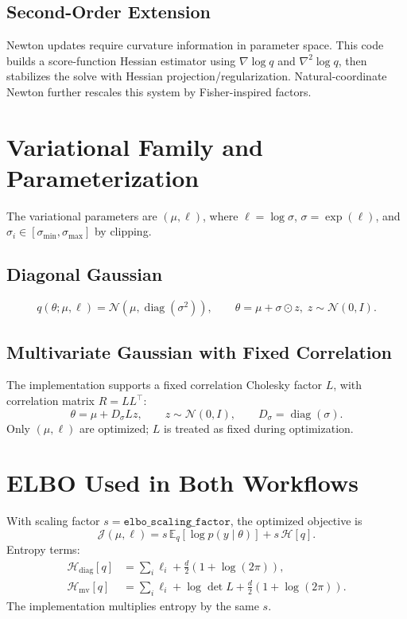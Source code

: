 \documentclass[11pt]{article}
\begin{document}
\subsection{Second-Order Extension}
Newton updates require curvature information in parameter space.
This code builds a score-function Hessian estimator using \(\nabla \log q\) and
\(\nabla^2 \log q\), then stabilizes the solve with Hessian projection/regularization.
Natural-coordinate Newton further rescales this system by Fisher-inspired factors.

\section{Variational Family and Parameterization}
The variational parameters are \((\mu,\ell)\), where \(\ell=\log \sigma\), \(\sigma=\exp(\ell)\), and \(\sigma_i\in[\sigma_{\min},\sigma_{\max}]\) by clipping.

\subsection{Diagonal Gaussian}
\begin{equation}
q(\theta;\mu,\ell)=\mathcal{N}\!\left(\mu,\operatorname{diag}(\sigma^2)\right),\qquad
\theta=\mu+\sigma\odot z,\; z\sim\mathcal{N}(0,I).
\end{equation}

\subsection{Multivariate Gaussian with Fixed Correlation}
The implementation supports a fixed correlation Cholesky factor \(L\), with
correlation matrix \(R=LL^\top\):
\begin{equation}
\theta=\mu + D_\sigma L z,\qquad z\sim\mathcal{N}(0,I),\qquad
D_\sigma=\operatorname{diag}(\sigma).
\end{equation}
Only \((\mu,\ell)\) are optimized; \(L\) is treated as fixed during optimization.

\section{ELBO Used in Both Workflows}
With scaling factor \(s=\texttt{elbo\_scaling\_factor}\), the optimized objective is
\begin{equation}
\mathcal{J}(\mu,\ell) = s\,\mathbb{E}_{q}[\log p(y\mid\theta)] + s\,\mathcal{H}[q].
\end{equation}
Entropy terms:
\begin{align}
\mathcal{H}_{\text{diag}}[q] &= \sum_i \ell_i + \frac{d}{2}\left(1+\log(2\pi)\right),\\
\mathcal{H}_{\text{mv}}[q] &= \sum_i \ell_i + \log\det L + \frac{d}{2}\left(1+\log(2\pi)\right).
\end{align}
The implementation multiplies entropy by the same \(s\).
\end{document}
